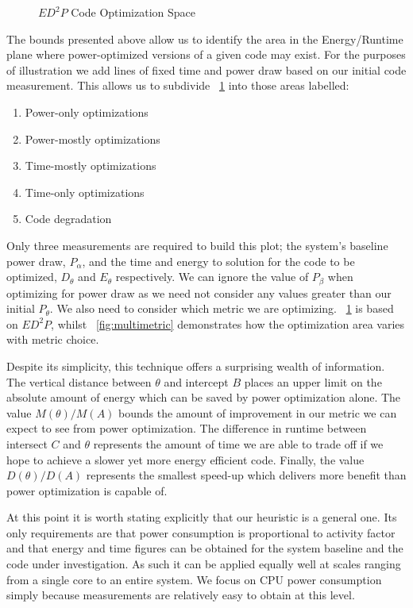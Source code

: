 \begin{figure}

\caption{$ED^2P$ Code Optimization Space}\label{fig:modeldraw}
\end{figure}

The bounds presented above allow us to identify the area in the Energy/Runtime plane where power-optimized versions of a given code may exist. For the purposes of illustration we add lines of fixed time and power draw based on our initial code measurement. This allows us to subdivide \figurename~\ref{fig:modeldraw} into those areas labelled:

\begin{enumerate}
\centering
\item Power-only optimizations
\item Power-mostly optimizations
\item Time-mostly optimizations
\item Time-only optimizations
\item Code degradation
\end{enumerate}

Only three measurements are required to build this plot; the system's baseline power draw, $P_\alpha$, and the time and energy to solution for the code to be optimized, $D_\theta$ and $E_\theta$ respectively. We can ignore the value of $P_\beta$ when optimizing for power draw as we need not consider any values greater than our initial $P_\theta$. We also need to consider which metric we are optimizing. \figurename~\ref{fig:modeldraw} is based on $ED^2P$, whilst \figurename~\ref{fig:multimetric} demonstrates how the optimization area varies with metric choice.

Despite its simplicity, this technique offers a surprising wealth of information. The vertical distance between $\theta$ and intercept $B$ places an upper limit on the absolute amount of energy which can be saved by power optimization alone. The value $M(\theta) / M(A)$ bounds the amount of improvement in our metric we can expect to see from power optimization. The difference in runtime between intersect $C$ and $\theta$ represents the amount of time we are able to trade off if we hope to achieve a slower yet more energy efficient code. Finally, the value $D(\theta) / D(A)$ represents the smallest speed-up which delivers more benefit than power optimization is capable of.

At this point it is worth stating explicitly that our heuristic is a general one. Its only requirements are that power consumption is proportional to activity factor and that energy and time figures can be obtained for the system baseline and the code under investigation. As such it can be applied equally well at scales ranging from a single core to an entire system. We focus on CPU power consumption simply because measurements are relatively easy to obtain at this level.

